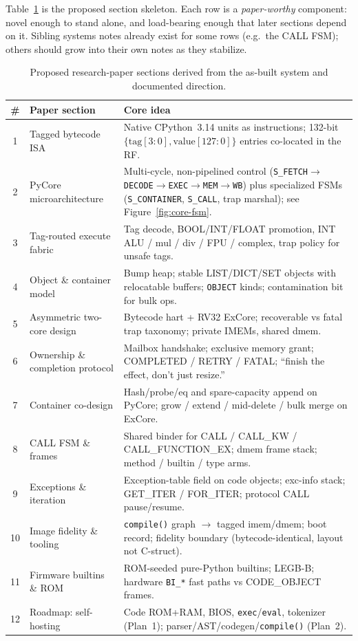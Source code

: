 \documentclass[11pt,a4paper]{article}
\begin{document}
Table~\ref{tab:sections} is the proposed section skeleton.
Each row is a \emph{paper-worthy} component: novel enough to stand alone, and
load-bearing enough that later sections depend on it.
Sibling systems notes already exist for some rows (e.g.\ the CALL FSM);
others should grow into their own notes as they stabilize.

\begin{table}[ht]
\centering
\small
\begin{tabular}{@{}clp{}@{}}
\toprule
\# & Paper section & Core idea \\
\midrule
1 & Tagged bytecode ISA &
  Native CPython~3.14 units as instructions; 132-bit
  $\{\mathrm{tag}[3{:}0],\mathrm{value}[127{:}0]\}$ entries co-located in the RF. \\
2 & PyCore microarchitecture &
  Multi-cycle, non-pipelined control
  (\texttt{S\_FETCH}${\to}$\texttt{DECODE}${\to}$\texttt{EXEC}${\to}$\texttt{MEM}${\to}$\texttt{WB})
  plus specialized FSMs (\texttt{S\_CONTAINER}, \texttt{S\_CALL}, trap marshal);
  see Figure~\ref{fig:core-fsm}. \\
3 & Tag-routed execute fabric &
  Tag decode, BOOL/INT/FLOAT promotion, INT ALU / mul / div / FPU / complex,
  trap policy for unsafe tags. \\
4 & Object \& container model &
  Bump heap; stable LIST/DICT/SET objects with relocatable buffers;
  \texttt{OBJECT} kinds; contamination bit for bulk ops. \\
5 & Asymmetric two-core design &
  Bytecode hart + RV32 ExCore; recoverable vs fatal trap taxonomy;
  private IMEMs, shared dmem. \\
6 & Ownership \& completion protocol &
  Mailbox handshake; exclusive memory grant; COMPLETED / RETRY / FATAL;
  ``finish the effect, don't just resize.'' \\
7 & Container co-design &
  Hash/probe/eq and spare-capacity append on PyCore;
  grow / extend / mid-delete / bulk merge on ExCore. \\
8 & CALL FSM \& frames &
  Shared binder for CALL / CALL\_KW / CALL\_FUNCTION\_EX;
  dmem frame stack; method / builtin / type arms. \\
9 & Exceptions \& iteration &
  Exception-table field on code objects; exc-info stack;
  GET\_ITER / FOR\_ITER; protocol CALL pause/resume. \\
10 & Image fidelity \& tooling &
  \texttt{compile()} graph $\to$ tagged imem/dmem; boot record;
  fidelity boundary (bytecode-identical, layout not C-struct). \\
11 & Firmware builtins \& ROM &
  ROM-seeded pure-Python builtins; LEGB-B;
  hardware \texttt{BI\_*} fast paths vs CODE\_OBJECT frames. \\
12 & Roadmap: self-hosting &
  Code ROM+RAM, BIOS, \texttt{exec}/\texttt{eval}, tokenizer (Plan~1);
  parser/AST/codegen/\texttt{compile()} (Plan~2). \\
\bottomrule
\end{tabular}
\caption{Proposed research-paper sections derived from the as-built system
and documented direction.}
\label{tab:sections}
\end{table}
\end{document}
